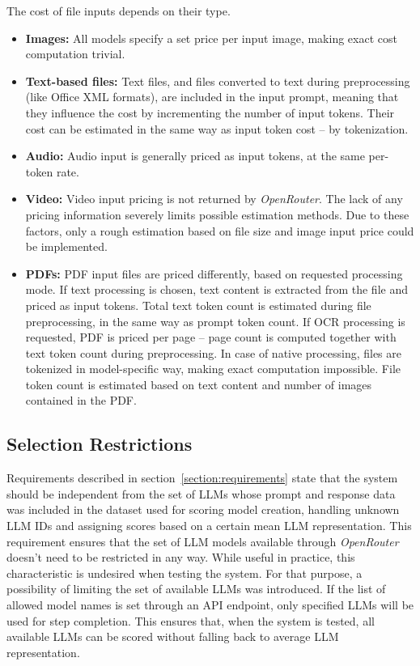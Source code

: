 \documentclass[a4paper,11pt,twoside]{report}
\theoremstyle{definition}
\begin{document}
The cost of file inputs depends on their type.

\begin{itemize}
    \item \textbf{Images:} All models specify a set price per input image, making exact cost computation trivial.
    \item \textbf{Text-based files:} Text files, and files converted to text during preprocessing (like Office XML formats), are included in the input prompt, meaning that they influence the cost by incrementing the number of input tokens. Their cost can be estimated in the same way as input token cost -- by tokenization.
    \item \textbf{Audio:} Audio input is generally priced as input tokens, at the same per-token rate.
    \item \textbf{Video:} Video input pricing is not returned by \textit{OpenRouter}. The lack of any pricing information severely limits possible estimation methods. Due to these factors, only a rough estimation based on file size and image input price could be implemented.
    \item \textbf{PDFs:} PDF input files are priced differently, based on requested processing mode. If text processing is chosen, text content is extracted from the file and priced as input tokens. Total text token count is estimated during file preprocessing, in the same way as prompt token count. If OCR processing is requested, PDF is priced per page -- page count is computed together with text token count during preprocessing. In case of native processing, files are tokenized in model-specific way, making exact computation impossible. File token count is estimated based on text content and number of images contained in the PDF. 
\end{itemize}

\subsection{Selection Restrictions}
\label{section:model-restriction}

Requirements described in section~\ref{section:requirements} state that the system should be independent from the set of LLMs whose prompt and response data was included in the dataset used for scoring model creation, handling unknown LLM IDs and assigning scores based on a certain mean LLM representation. This requirement ensures that the set of LLM models available through \textit{OpenRouter} doesn't need to be restricted in any way. While useful in practice, this characteristic is undesired when testing the system. For that purpose, a possibility of limiting the set of available LLMs was introduced. If the list of allowed model names is set through an API endpoint, only specified LLMs will be used for step completion. This ensures that, when the system is tested, all available LLMs can be scored without falling back to average LLM representation.
\end{document}
